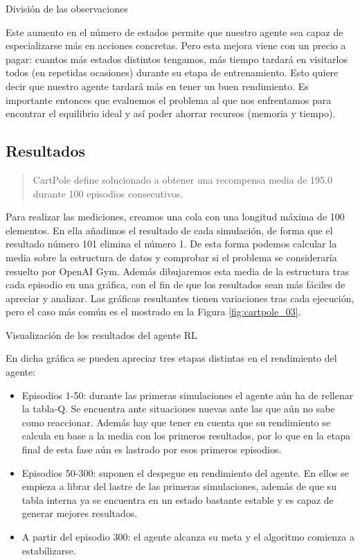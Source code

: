 %
       {División de las observaciones}

Este aumento en el número de estados permite que nuestro agente sea capaz de especializarse más en acciones concretas. Pero esta mejora viene con un precio a pagar: cuantos más estados distintos tengamos, más tiempo tardará en visitarlos todos (en repetidas ocasiones) durante su etapa de entrenamiento. Esto quiere decir que nuestro agente tardará más en tener un buen rendimiento. Es importante entonces que evaluemos el problema al que nos enfrentamos para encontrar el equilibrio ideal y así poder ahorrar recursos (memoria y tiempo).

\subsection{Resultados}
\begin{quote}
    CartPole define solucionado a obtener una recompensa media de 195.0 durante 100 episodios consecutivos.
\end{quote}

Para realizar las mediciones, creamos una cola con una longitud máxima de 100 elementos. En ella añadimos el resultado de cada simulación, de forma que el resultado número 101 elimina el número 1. De esta forma podemos calcular la media sobre la estructura de datos y comprobar si el problema se consideraría resuelto por OpenAI Gym. Además dibujaremos esta media de la estructura tras cada episodio en una gráfica, con el fin de que los resultados sean más fáciles de apreciar y analizar. Las gráficas resultantes tienen variaciones tras cada ejecución, pero el caso más común es el mostrado en la Figura \ref{fig:cartpole_03}.

%
       {Visualización de los resultados del agente RL}

En dicha gráfica se pueden apreciar tres etapas distintas en el rendimiento del agente:
\begin{itemize}
    \item Episodios 1-50: durante las primeras simulaciones el agente aún ha de rellenar la tabla-Q. Se encuentra ante situaciones nuevas ante las que aún no sabe como reaccionar. Además hay que tener en cuenta que su rendimiento se calcula en base a la media con los primeros resultados, por lo que en la etapa final de esta fase aún es lastrado por esos primeros episodios.
    \item Episodios 50-300: suponen el despegue en rendimiento del agente. En ellos se empieza a librar del lastre de las primeras simulaciones, además de que su tabla interna ya se encuentra en un estado bastante estable y es capaz de generar mejores resultados.
    \item A partir del episodio 300: el agente alcanza su meta y el algoritmo comienza a estabilizarse.
\end{itemize}

